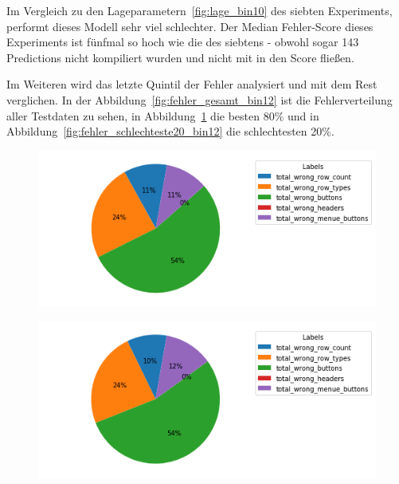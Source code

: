 \documentclass[pdftex,a4paper,halfparskip, article]{scrartcl}
\begin{document}
Im Vergleich zu den Lageparametern~\ref{fig:lage_bin10} des siebten Experiments, performt dieses Modell sehr viel schlechter. Der Median Fehler-Score dieses Experiments ist fünfmal so hoch wie die des siebtens - obwohl sogar 143 Predictions nicht kompiliert wurden und nicht mit in den Score fließen.

Im Weiteren wird das letzte Quintil der Fehler analysiert und mit dem Rest verglichen. In der Abbildung~\ref{fig:fehler_gesamt_bin12} ist die Fehlerverteilung aller Testdaten zu sehen, in Abbildung~\ref{fig:fehler_beste80_bin12} die besten 80\% und in Abbildung~\ref{fig:fehler_schlechteste20_bin12} die schlechtesten 20\%. 

\begin{figure}
\centering
\begin{minipage}{.5\textwidth}
  \centering
  \includegraphics[width=1\linewidth]{predictions_bin12_total_error_types_pie_chart}
  \label{fig:fehler_gesamt_bin12}
\end{minipage}%
\begin{minipage}{.5\textwidth}
  \centering
  \includegraphics[width=1\linewidth]{predictions_bin12_excluded_p80_error_types_pie_chart}
  \label{fig:fehler_beste80_bin12}
\end{minipage}
\begin{minipage}{.5\textwidth}

\end{minipage}
\end{figure}
\end{document}
